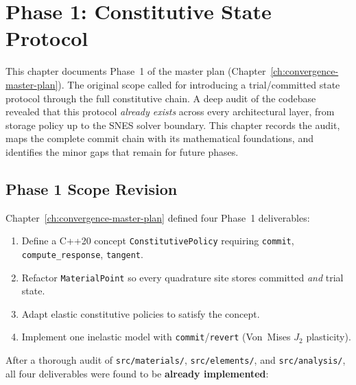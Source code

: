 
\chapter{Phase 1: Constitutive State Protocol}
\label{ch:phase1-constitutive-state}

This chapter documents Phase~1 of the master plan
(Chapter~\ref{ch:convergence-master-plan}).  The original scope
called for introducing a trial/committed state protocol through the
full constitutive chain.  A deep audit of the codebase revealed that
this protocol \emph{already exists} across every architectural layer,
from storage policy up to the SNES solver boundary.  This chapter
records the audit, maps the complete commit chain with its mathematical
foundations, and identifies the minor gaps that remain for future phases.

\section{Phase 1 Scope Revision}
\label{sec:phase1-scope-revision}

Chapter~\ref{ch:convergence-master-plan} defined four Phase~1 deliverables:

\begin{enumerate}
  \item Define a C++20 concept \texttt{ConstitutivePolicy} requiring
        \texttt{commit}, \texttt{compute\_response}, \texttt{tangent}.
  \item Refactor \texttt{MaterialPoint} so every quadrature site stores
        committed \emph{and} trial state.
  \item Adapt elastic constitutive policies to satisfy the concept.
  \item Implement one inelastic model with \texttt{commit}/\texttt{revert}
        (Von~Mises $J_2$ plasticity).
\end{enumerate}

After a thorough audit of \texttt{src/materials/},
\texttt{src/elements/}, and \texttt{src/analysis/}, all four
deliverables were found to be \textbf{already implemented}:

